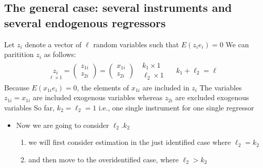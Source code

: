 \documentclass[a4paper,twoside,11pt]{article}
\begin{document}
\subsection{The general case: several instruments and several endogenous regressors}
Let $z_i$ denote a vector of $\ell$ random variables such that $E(z_i e_i)=0$ 
\newline
\newline
We can paritition $z_i$ as follows:
\begin{equation*}
\begin{aligned}
\underset{\ell \times 1}{z_i} = \begin{pmatrix}
z_{1i} \\
z_{2i}
\end{pmatrix} =\begin{pmatrix}
x_{1i} \\
z_{2i}
\end{pmatrix} \ \ \ \begin{matrix}
k_1 \times 1 \\
\ell_2 \times 1
\end{matrix} \ \ \ \ \ \ k_1 + \ell_2 = \ell
\end{aligned} 
\end{equation*}
Because $E(x_{1i}e_i) = 0$, the elements of $x_{1i}$ are included in $z_i$
\newline
\newline
The variables $z_{1i} = x_{1i}$ are included exogenous variables whereas $z_{2i}$ are excluded exogenous variables
\newline
\newline
So far, $k_2 = \ell_2 =1$ i.e., one single instrument for one single regressor
\begin{itemize}
    \item Now we are going to consider $\ell_2 . k_2$
    \begin{enumerate}
        \item we will first consider estimation in the just identified case where $\ell_2 = k_2$
        \item and then move to the overidentified case, where $\ell_2 > k_2$
    \end{enumerate}
\end{itemize}
\end{document}
